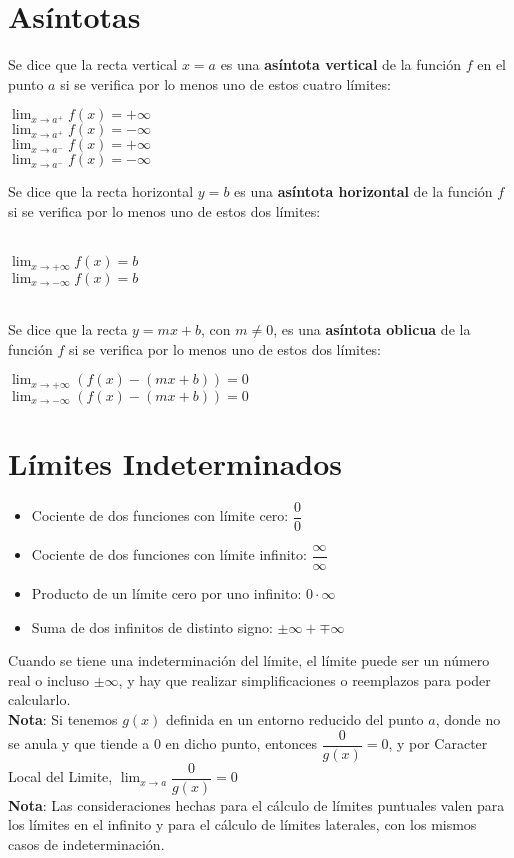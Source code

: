 \documentclass[11pt,a4paper]{article}
\begin{document}
\section{As\'intotas}
\noindent Se dice que la recta vertical $x=a$ es una \textbf{asíntota vertical} de la función $f$ en el punto $a$ si se verifica por lo menos uno de estos cuatro límites:
\begin{multicols}{4}
$\displaystyle{\lim_{x \to a^+} f(x) = +\infty}$\\
$\displaystyle{\lim_{x \to a^+} f(x) = -\infty}$\\
$\displaystyle{\lim_{x \to a^-} f(x) = +\infty}$\\
$\displaystyle{\lim_{x \to a^-} f(x) = -\infty}$
\end{multicols}

\noindent Se dice que la recta horizontal $y=b$ es una \textbf{asíntota horizontal} de la función $f$ si se verifica por lo menos uno de estos dos límites:
\begin{multicols}{4}
\ \\
$\displaystyle{\lim_{x \to +\infty} f(x) = b}$\\
$\displaystyle{\lim_{x \to -\infty} f(x) = b}$\\
\ 
\end{multicols}

\noindent Se dice que la recta $y=mx+b$, con $m \not = 0$, es una \textbf{asíntota oblicua} de la función $f$ si se verifica por lo menos uno de estos dos límites:
\begin{multicols}{2}
$\displaystyle{\lim_{x \to +\infty} (f(x)-(mx+b)) = 0}$\\
$\displaystyle{\lim_{x \to -\infty} (f(x)-(mx+b)) = 0}$
\end{multicols}

\section{L\'imites Indeterminados}
\begin{itemize}
\item Cociente de dos funciones con l\'imite cero: $\dfrac{0}{0}$
\item Cociente de dos funciones con l\'imite infinito: $\dfrac{\infty}{\infty}$
\item Producto de un l\'imite cero por uno infinito: $0\cdot \infty$
\item Suma de dos infinitos de distinto signo: $\pm \infty + \mp \infty$
\end{itemize}
Cuando se tiene una indeterminaci\'on del l\'imite, el l\'imite puede ser un n\'umero real o incluso $\pm \infty$, y hay que realizar simplificaciones o reemplazos para poder calcularlo.\\
\textbf{Nota}: Si tenemos $g(x)$ definida en un entorno reducido del punto $a$, donde no se anula y que tiende a $0$ en dicho punto, entonces $\dfrac{0}{g(x)} = 0$, y por Caracter Local del Limite, $\displaystyle{\lim_{x \to a} \dfrac{0}{g(x)} = 0}$\\
\textbf{Nota}: Las consideraciones hechas para el c\'alculo de l\'imites puntuales valen para los l\'imites en el infinito y para el c\'alculo de l\'imites laterales, con los mismos casos de indeterminaci\'on.
\end{document}
